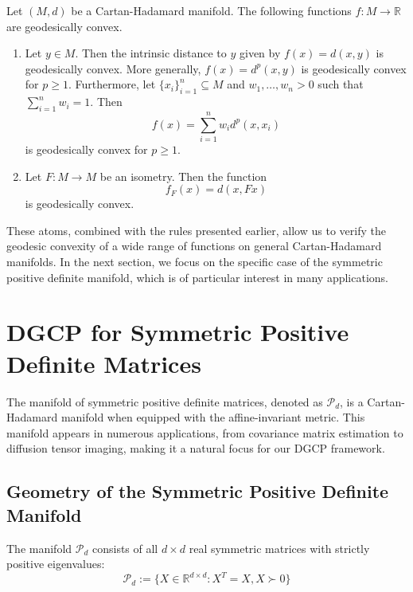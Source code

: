 \begin{example}
Let $(M, d)$ be a Cartan-Hadamard manifold. The following functions $f: M \rightarrow \mathbb{R}$ are geodesically convex.
\begin{enumerate}
\item Let $y \in M$. Then the intrinsic distance to $y$ given by $f(x) = d(x, y)$ is geodesically convex. More generally, $f(x) = d^p(x, y)$ is geodesically convex for $p \geq 1$. Furthermore, let $\{x_i\}_{i=1}^n \subseteq M$ and $w_1, \ldots, w_n > 0$ such that $\sum_{i=1}^n w_i = 1$. Then
\begin{equation}
f(x) = \sum_{i=1}^n w_i d^p(x, x_i)
\end{equation}
is geodesically convex for $p \geq 1$.
\item Let $F: M \rightarrow M$ be an isometry. Then the function
\begin{equation}
f_F(x) = d(x, Fx)
\end{equation}
is geodesically convex.
\end{enumerate}
\end{example}

These atoms, combined with the rules presented earlier, allow us to verify the geodesic convexity of a wide range of functions on general Cartan-Hadamard manifolds. In the next section, we focus on the specific case of the symmetric positive definite manifold, which is of particular interest in many applications.

\section{DGCP for Symmetric Positive Definite Matrices}

The manifold of symmetric positive definite matrices, denoted as $\mathcal{P}_d$, is a Cartan-Hadamard manifold when equipped with the affine-invariant metric. This manifold appears in numerous applications, from covariance matrix estimation to diffusion tensor imaging, making it a natural focus for our DGCP framework.

\subsection{Geometry of the Symmetric Positive Definite Manifold}

The manifold $\mathcal{P}_d$ consists of all $d \times d$ real symmetric matrices with strictly positive eigenvalues:
\begin{equation}
\mathcal{P}_d := \{X \in \mathbb{R}^{d \times d} : X^T = X, X \succ 0\}
\end{equation}

